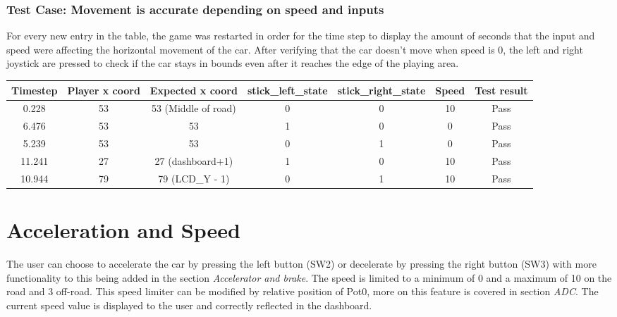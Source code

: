 \documentclass{article}
\begin{document}
\subsubsection*{Test Case: Movement is accurate depending on speed and inputs}
For every new entry in the table, the game was restarted in order for the time step to display the amount of seconds that the input and speed were affecting the horizontal movement of the car. After verifying that the car doesn't move when speed is 0, the left and right joystick are pressed to check if the car stays in bounds even after it reaches the edge of the playing area.
\begin{center}
\begin{tabular}{ c c c c c c c }
Timestep	& Player x coord	& Expected x coord		& stick\_left\_state		& stick\_right\_state	& Speed	& Test result		\\ \hline
0.228		& 53			& 53 (Middle of road)	& 0				& 0				& 10		& Pass		\\
6.476		& 53			& 53				& 1				& 0				& 0		& Pass		\\
5.239		& 53			& 53				& 0				& 1				& 0		& Pass		\\
11.241	& 27			& 27 (dashboard+1)	& 1				& 0				& 10		& Pass		\\
10.944	& 79			& 79 (LCD\_Y - 1)		& 0				& 1				& 10		& Pass		\\ \hline
\end{tabular}
\end{center}

\clearpage

\section{Acceleration and Speed}
The user can choose to accelerate the car by pressing the left button (SW2) or decelerate by pressing the right button (SW3) with more functionality to this being added in the section \emph{Accelerator and brake}. The speed is limited to a minimum of 0 and a maximum of 10 on the road and 3 off-road. This speed limiter can be modified by relative position of Pot0, more on this feature is covered in section \emph{ADC}. The current speed value is displayed to the user and correctly reflected in the dashboard.
\end{document}
